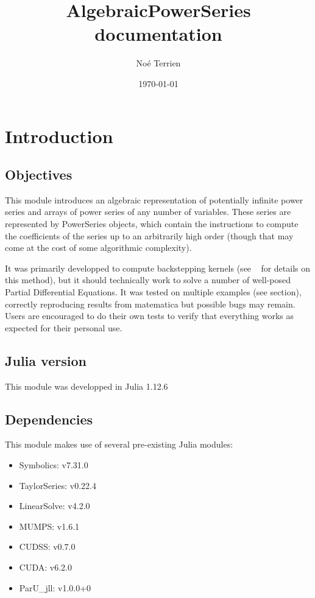 \documentclass[11pt,a4paper]{article}
\title{\Huge{\textbf{AlgebraicPowerSeries documentation}}}
\author{Noé Terrien}
\date{\today}
\begin{document}
\maketitle
\vspace{1em}
\tableofcontents

\section{Introduction}

\subsection{Objectives}

This module introduces an algebraic representation of potentially infinite power series and arrays of power series of any number of variables. These series are represented by PowerSeries objects, which contain the instructions to compute the coefficients of the series up to an arbitrarily high order (though that may come at the cost of some algorithmic complexity).

It was primarily developped to compute backstepping kernels (see ~\cite{krstic-book} for details on this method), but it should technically work to solve a number of well-posed Partial Differential Equations. It was tested on multiple examples (see  section), correctly reproducing results from matematica but possible bugs may remain. Users are encouraged to do their own tests to verify that everything works as expected for their personal use.


\subsection{Julia version}

This module was developped in Julia 1.12.6

\subsection{Dependencies}

This module makes use of several pre-existing Julia modules:

\begin{itemize}
    \item Symbolics: v7.31.0
    \item TaylorSeries: v0.22.4
    \item LinearSolve: v4.2.0
    \item MUMPS: v1.6.1
    \item CUDSS: v0.7.0
    \item CUDA: v6.2.0
    \item ParU\_jll: v1.0.0+0
\end{itemize}
\end{document}
